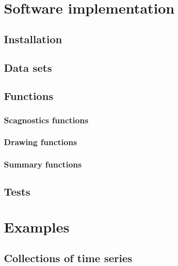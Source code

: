 \hypertarget{software-implementation}{%
\section{Software implementation}\label{software-implementation}}

\hypertarget{installation}{%
\subsection{Installation}\label{installation}}

\hypertarget{data-sets}{%
\subsection{Data sets}\label{data-sets}}

\hypertarget{functions}{%
\subsection{Functions}\label{functions}}

\hypertarget{scagnostics-functions}{%
\subsubsection{Scagnostics functions}\label{scagnostics-functions}}

\hypertarget{drawing-functions}{%
\subsubsection{Drawing functions}\label{drawing-functions}}

\hypertarget{summary-functions}{%
\subsubsection{Summary functions}\label{summary-functions}}

\hypertarget{tests}{%
\subsection{Tests}\label{tests}}

\hypertarget{examples}{%
\section{Examples}\label{examples}}

\hypertarget{collections-of-time-series}{%
\subsection{Collections of time
series}\label{collections-of-time-series}}

